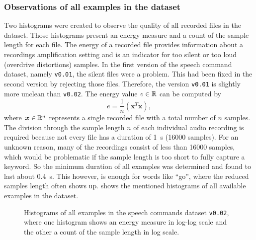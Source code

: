 \subsubsection{Observations of all examples in the dataset}
Two histograms were created to observe the quality of all recorded files in the dataset.
Those histograms present an energy measure and a count of the sample length for each file.
The energy of a recorded file provides information about a recordings amplification setting and is an indicator for too silent or too loud (overdrive distortions) samples.
In the first version of the speech command dataset, namely \texttt{v0.01}, the silent files were a problem.
This had been fixed in the second version by rejecting those files.
Therefore, the version \texttt{v0.01} is slightly more unclean than \texttt{v0.02}.
The energy value $e \in \mathbb{R}$ can be computed by
\begin{equation}\label{eq:exp_dataset_energy}
  e = \frac{1}{n} \left( \bm{x}^T \bm{x} \right),
\end{equation}
where $\bm{x} \in \mathbb{R}^n$ represents a single recorded file with a total number of $n$ samples.
The division through the sample length $n$ of each individual audio recording is required because not every file has a duration of \SI{1}{\second} (16000 samples).
For an unknown reason, many of the recordings consist of less than 16000 samples, which would be problematic if the sample length is too short to fully capture a keyword.
So the minimum duration of all examples was determined and found to last about \SI{0.4}{\second}.
This however, is enough for words like \enquote{go}, where the reduced samples length often shows up.
 shows the mentioned histograms of all available examples in the dataset.
\begin{figure}[!ht]
  \centering
    \qquad
  \caption{Histograms of all examples in the speech commands dataset \texttt{v0.02}, where one histogram shows an energy measure in log-log scale and the other a count of the sample length in log scale.}
  \label{fig:exp_dataset_hist}
\end{figure}
